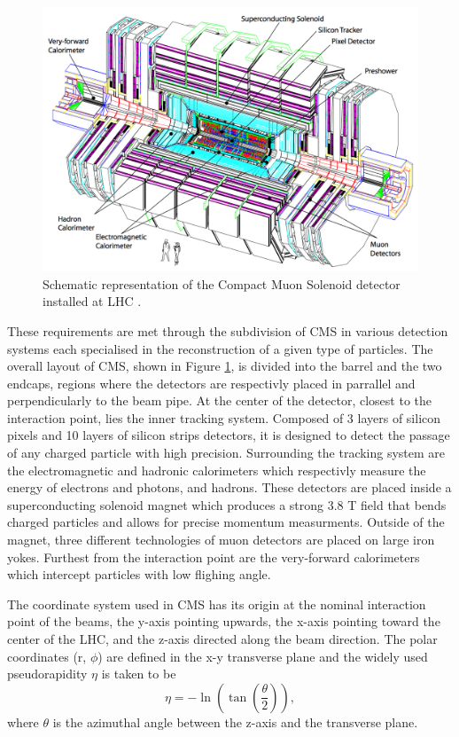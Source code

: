     \begin{figure}[h!]
      \centering
      \includegraphics[width=\textwidth]{img/I-3-cms/cms.png}
      \caption{Schematic representation of the Compact Muon Solenoid detector installed at LHC \cite{1748-0221-3-08-S08004}.}
      \label{fig:I-3-cms-global-view}
    \end{figure}

    These requirements are met through the subdivision of CMS in various detection systems each specialised in the reconstruction of a given type of particles. The overall layout of CMS, shown in Figure \ref{fig:I-3-cms-global-view}, is divided into the barrel and the two endcaps, regions where the detectors are respectivly placed in parrallel and perpendicularly to the beam pipe. At the center of the detector, closest to the interaction point, lies the inner tracking system. Composed of 3 layers of silicon pixels and 10 layers of silicon strips detectors, it is designed to detect the passage of any charged particle with high precision. Surrounding the tracking system are the electromagnetic and hadronic calorimeters which respectivly measure the energy of electrons and photons, and hadrons. These detectors are placed inside a superconducting solenoid magnet which produces a strong 3.8 T field that bends charged particles and allows for precise momentum measurments. Outside of the magnet, three different technologies of muon detectors are placed on large iron yokes. Furthest from the interaction point are the very-forward calorimeters which intercept particles with low flighing angle.

    The coordinate system used in CMS has its origin at the nominal interaction point of the beams, the y-axis pointing upwards, the x-axis pointing toward the center of the LHC, and the z-axis directed along the beam direction. The polar coordinates (r, $ \phi $) are defined in the x-y transverse plane and the widely used pseudorapidity $ \eta $ is taken to be
    \begin{equation}
      \eta = - \ln\left( \tan\left( \frac{\theta}{2} \right) \right) ,
    \end{equation}
    where $ \theta $ is the azimuthal angle between the z-axis and the transverse plane.

